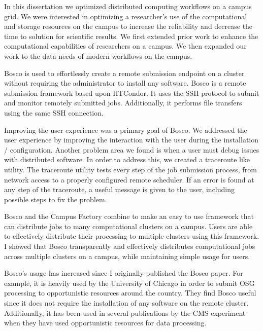 \label{chapter:coordinatingstorage}

In this dissertation we optimized distributed computing workflows on a campus grid.  We were interested in optimizing a researcher's use of the computational and storage resources on the campus to increase the reliability and decrease the time to solution for scientific results.  We first extended prior work to enhance the computational capabilities of researchers on a campus.  We then expanded our work to the data needs of modern workflows on the campus.

Bosco is used to effortlessly create a remote submission endpoint on a cluster without requiring the administrator to install any software.  Bosco is a remote submission framework based upon HTCondor.  It uses the SSH protocol to submit and monitor remotely submitted jobs.  Additionally, it performs file transfers using the same SSH connection.

Improving the user experience was a primary goal of Bosco.  We addressed the user experience by improving the interaction with the user during the installation / configuration.  Another problem area we found is when a user must debug issues with distributed software.  In order to address this, we created a traceroute like utility.  The traceroute utility tests every step of the job submission process, from network access to a properly configured remote scheduler.  If an error is found at any step of the traceroute, a useful message is given to the user, including possible steps to fix the problem.

Bosco and the Campus Factory combine to make an easy to use framework that can distribute jobs to many computational clusters on a campus.  Users are able to effectively distribute their processing to multiple clusters using this framework.  I showed that Bosco transparently and effectively distributes computational jobs across multiple clusters on a campus, while maintaining simple usage for users.

Bosco's usage has increased since I originally published the Bosco paper.  For example, it is heavily used by the University of Chicago in order to submit OSG processing to opportunistic resources around the country.  They find Bosco useful since it does not require the installation of any software on the remote cluster.  Additionally, it has been used in several publications by the CMS experiment when they have used opportunistic resources for data processing.

